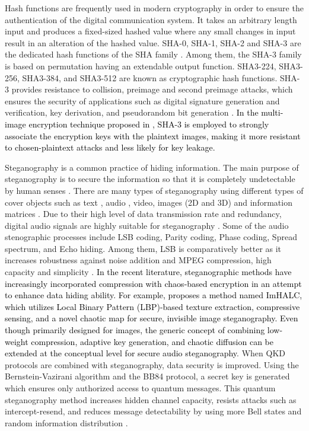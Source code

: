 \documentclass[a4paper]{cas-sc}
\begin{document}
Hash functions are frequently used in modern cryptography in order to ensure the authentication of the digital communication system. It takes an arbitrary length input and produces a fixed-sized hashed value where any small changes in input result in an alteration of the hashed value. SHA-0, SHA-1, SHA-2 and SHA-3 are the dedicated hash functions of the SHA family \cite{madhuravani2013cryptographic}. Among them, the SHA-3 family is based on permutation having an extendable output function. SHA3-224, SHA3-256, SHA3-384, and SHA3-512 are known as cryptographic hash functions. SHA-3 provides resistance to collision, preimage and second preimage attacks, which ensures the security of applications such as digital signature generation and verification, key derivation, and pseudorandom bit generation \cite{dworkin2015sha}. \textcolor{black}{In the multi-image encryption technique proposed in \cite{hu2024multi}, SHA-3 is employed to strongly associate the encryption keys with the plaintext images, making it more resistant to chosen-plaintext attacks and less likely for key leakage.}

Steganography is a common practice of hiding information. The main purpose of steganography is to secure the information so that it is completely undetectable by human senses \cite{amin2003information}. There are many types of steganography using different types of cover objects such as text \cite{yang2018rnn}, audio \cite{jayaram2011information}\cite{hemeida2021comparative}\cite{djebbar2012comparative}, video, images (2D and 3D) \cite{farrag2020secure} and information matrices \cite{mashaly2019multiple}. Due to their high level of data transmission rate and redundancy, digital audio signals are highly suitable for steganography \cite{singh2014survey}. Some of the audio stenographic processes include LSB coding, Parity coding, Phase coding, Spread spectrum, and Echo hiding. Among them, LSB is comparatively better as it increases robustness against noise addition and MPEG compression, high capacity and simplicity \cite{cvejic2004increasing}\cite{jayaram2011information}. \textcolor{black}{In the recent literature, steganographic methods have increasingly incorporated compression with chaos-based encryption in an attempt to enhance data hiding ability. For example, \cite{YE2025316} proposes a method named ImHALC, which utilizes Local Binary Pattern (LBP)-based texture extraction, compressive sensing, and a novel chaotic map for secure, invisible image steganography. Even though primarily designed for images, the generic concept of combining low-weight compression, adaptive key generation, and chaotic diffusion can be extended at the conceptual level for secure audio steganography}. When QKD protocols are combined with steganography, data security is improved. Using the Bernstein-Vazirani algorithm and the BB84 protocol, a secret key is generated which ensures only authorized access to quantum messages. This quantum steganography method increases hidden channel capacity, resists attacks such as intercept-resend, and reduces message detectability by using more Bell states and random information distribution \cite{yalla2022novel}.
\end{document}
